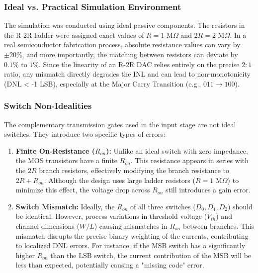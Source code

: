 \documentclass[conference]{IEEEtran}
\begin{document}
\subsubsection{Ideal vs. Practical Simulation Environment}
The simulation was conducted using ideal passive components. The resistors in the R-2R ladder were assigned exact values of $R = 1 \text{ M}\Omega$ and $2R = 2 \text{ M}\Omega$. In a real semiconductor fabrication process, absolute resistance values can vary by $\pm 20\%$, and more importantly, the matching between resistors can deviate by $0.1\%$ to $1\%$. Since the linearity of an R-2R DAC relies entirely on the precise $2:1$ ratio, any mismatch directly degrades the INL and can lead to non-monotonicity (DNL < -1 LSB), especially at the Major Carry Transition (e.g., $011 \to 100$).

\subsubsection{Switch Non-Idealities}
The complementary transmission gates used in the input stage are not ideal switches. They introduce two specific types of errors:

\begin{enumerate}
    \item \textbf{Finite On-Resistance ($R_{on}$):} Unlike an ideal switch with zero impedance, the MOS transistors have a finite $R_{on}$. This resistance appears in series with the $2R$ branch resistors, effectively modifying the branch resistance to $2R + R_{on}$. Although the design uses large ladder resistors ($R=1 \text{ M}\Omega$) to minimize this effect, the voltage drop across $R_{on}$ still introduces a gain error.
    
    \item \textbf{Switch Mismatch:} Ideally, the $R_{on}$ of all three switches ($D_0, D_1, D_2$) should be identical. However, process variations in threshold voltage ($V_{th}$) and channel dimensions ($W/L$) causing mismatches in $R_{on}$ between branches. This mismatch disrupts the precise binary weighting of the currents, contributing to localized DNL errors. For instance, if the MSB switch has a significantly higher $R_{on}$ than the LSB switch, the current contribution of the MSB will be less than expected, potentially causing a "missing code" error.
\end{enumerate}
\end{document}
